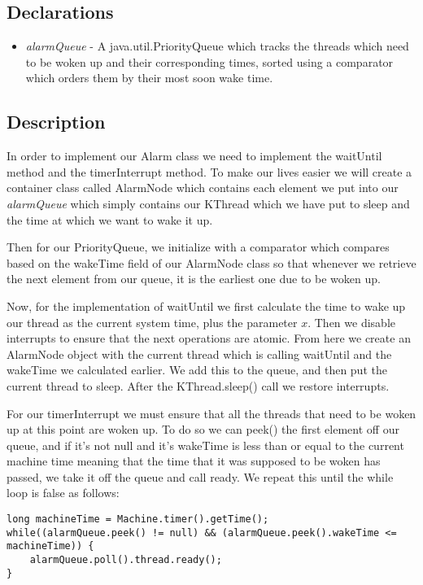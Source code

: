 \documentclass{article}
\begin{document}
\subsection*{Declarations}
\begin{itemize}
\item \textit{alarmQueue} - A java.util.PriorityQueue which tracks the threads which need to be woken up
and their corresponding times, sorted using a comparator which orders them by their most soon wake time.
\end{itemize}

\subsection*{Description}

In order to implement our Alarm class we need to implement the waitUntil method and the timerInterrupt method. To
make our lives easier we will create a container class called AlarmNode which contains each element we put into our
\textit{alarmQueue} which simply contains our KThread which we have put to sleep and the time at which we want to
wake it up.

Then for our PriorityQueue, we initialize with a comparator which compares based on the wakeTime field of our
AlarmNode class so that whenever we retrieve the next element from our queue, it is the earliest one due to be woken
up.

Now, for the implementation of waitUntil we first calculate the time to wake up our thread as the current system time,
plus the parameter $x$. Then we disable interrupts to ensure that the next operations are atomic. From here we create
an AlarmNode object with the current thread which is calling waitUntil and the wakeTime we calculated earlier. We add
this to the queue, and then put the current thread to sleep. After the KThread.sleep() call we restore interrupts.

For our timerInterrupt we must ensure that all the threads that need to be woken up at this point are woken up. To do
so we can peek() the first element off our queue, and if it's not null and it's wakeTime is less than or equal to
the current machine time meaning that the time that it was supposed to be woken has passed, we take it off the 
queue and call ready. We repeat this until the while loop is false as follows:
\begin{lstlisting}
long machineTime = Machine.timer().getTime();
while((alarmQueue.peek() != null) && (alarmQueue.peek().wakeTime <= machineTime)) {
    alarmQueue.poll().thread.ready();
}
\end{lstlisting}
\end{document}
